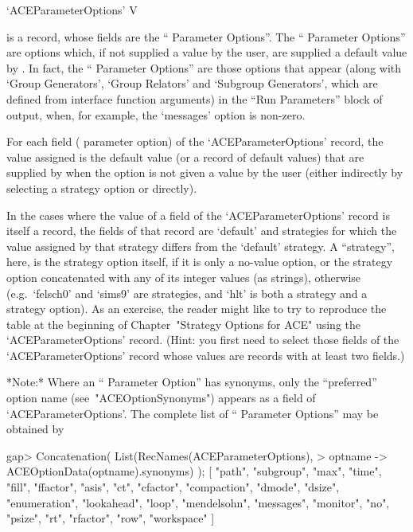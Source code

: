 \>`ACEParameterOptions' V

is a {\GAP} record, whose fields are the ``{\ACE} Parameter Options''.
The ``{\ACE} Parameter Options'' are options which, if not supplied  a
value by the user, are supplied a default value by  {\ACE}.  In  fact,
the ``{\ACE} Parameter Options'' are those options that appear  (along
with `Group Generators', `Group Relators' and  `Subgroup  Generators',
which are defined from {\ACE} interface  function  arguments)  in  the
``Run Parameters'' block of {\ACE}  output,  when,  for  example,  the
`messages' option is non-zero.

For each field ({\ACE} parameter option) of the  `ACEParameterOptions'
record, the value assigned is  the  default  value  (or  a  record  of
default values) that are supplied by {\ACE} when  the  option  is  not
given a value by the user (either indirectly by selecting  a  strategy
option or directly).

In the cases where the value of a field of  the  `ACEParameterOptions'
record is itself a record, the fields of that record are `default' and
strategies for which the value assigned by that strategy differs  from
the `default' strategy. A ``strategy'', here, is the  strategy  option
itself, if it is only  a  no-value  option,  or  the  strategy  option
concatenated with any of its integer values  (as  strings),  otherwise
(e.g.~`felsch0' and `sims9'  are  strategies,  and  `hlt'  is  both  a
strategy and a strategy option). As an exercise, the reader might like
to try to reproduce the table at the  beginning  of  Chapter~"Strategy
Options for ACE" using the `ACEParameterOptions'  record.  (Hint:  you
first need to select those fields of the `ACEParameterOptions'  record
whose values are records with at least two fields.)

*Note:*
Where  an  ``{\ACE}  Parameter  Option''  has   synonyms,   only   the
``preferred'' option name (see~"ACEOptionSynonyms") appears as a field
of `ACEParameterOptions'. The  complete  list  of  ``{\ACE}  Parameter
Options'' may be obtained by

\beginexample
gap> Concatenation( List(RecNames(ACEParameterOptions),
>                        optname -> ACEOptionData(optname).synonyms) );
[ "path", "subgroup", "max", "time", "fill", "ffactor", "asis", "ct", 
  "cfactor", "compaction", "dmode", "dsize", "enumeration",
  "lookahead", "loop", "mendelsohn", "messages", "monitor", "no",
  "psize", "rt", "rfactor", "row", "workspace" ]

\endexample

